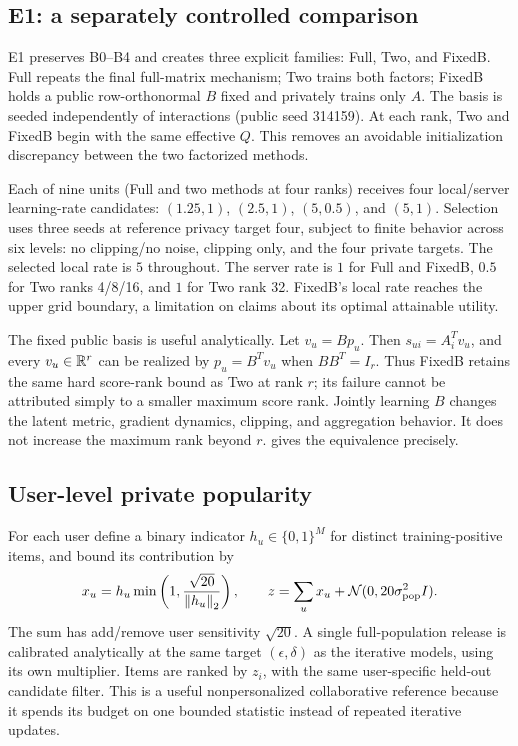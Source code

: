 \subsection{E1: a separately controlled comparison}
E1 preserves B0--B4 and creates three explicit families: Full, Two, and FixedB.
Full repeats the final full-matrix mechanism; Two trains both factors; FixedB
holds a public row-orthonormal $B$ fixed and privately trains only $A$.
The basis is seeded independently of interactions (public seed 314159).
At each rank, Two and FixedB begin with the same effective $Q$. This removes
an avoidable initialization discrepancy between the two factorized methods.

Each of nine units (Full and two methods at four ranks) receives four
local/server learning-rate candidates: $(1.25,1)$, $(2.5,1)$, $(5,0.5)$,
and $(5,1)$. Selection uses three seeds at reference privacy target four,
subject to finite behavior across six levels: no clipping/no noise,
clipping only, and the four private targets. The selected local rate is
$5$ throughout. The server rate is $1$ for Full and FixedB, $0.5$ for
Two ranks 4/8/16, and $1$ for Two rank 32. FixedB's local rate reaches the
upper grid boundary, a limitation on claims about its optimal attainable utility.

The fixed public basis is useful analytically. Let $v_u=Bp_u$. Then
$s_{ui}=A_i^Tv_u$, and every $v_u\in\mathbb{R}^r$ can be realized by
$p_u=B^Tv_u$ when $BB^T=I_r$. Thus FixedB retains the same hard score-rank
bound as Two at rank $r$; its failure cannot be attributed simply to a
smaller maximum score rank. Jointly learning $B$ changes the latent metric,
gradient dynamics, clipping, and aggregation behavior. It does not increase
the maximum rank beyond $r$.  gives the equivalence precisely.

\subsection{User-level private popularity}
For each user define a binary indicator $h_u\in\{0,1\}^M$ for distinct
training-positive items, and bound its contribution by
\begin{equation}
 x_u=h_u\min\left(1,\frac{\sqrt{20}}{\left\lVert h_u\right\rVert_2}\right),\qquad
 z=\sum_u x_u+\mathcal N(0,20\sigma_{\mathrm{pop}}^2I).
 \label{eq:pop}
\end{equation}
The sum has add/remove user sensitivity $\sqrt{20}$. A single full-population
release is calibrated analytically at the same target $(\epsilon,\delta)$
as the iterative models, using its own multiplier. Items are ranked by $z_i$,
with the same user-specific held-out candidate filter. This is a useful
nonpersonalized collaborative reference because it spends its budget on one
bounded statistic instead of repeated iterative updates.

